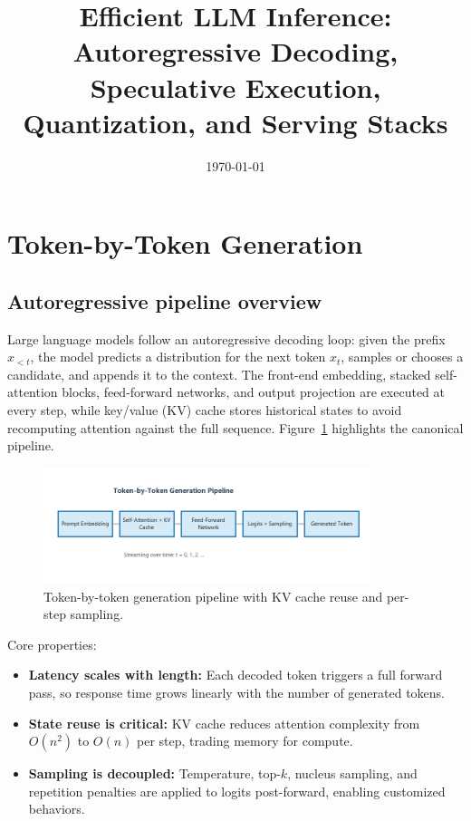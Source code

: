 \documentclass{article}
\title{Efficient LLM Inference: Autoregressive Decoding, Speculative Execution, Quantization, and Serving Stacks}
\author{}
\date{\today}
\begin{document}
\maketitle

\section{Token-by-Token Generation}
\subsection{Autoregressive pipeline overview}
Large language models follow an autoregressive decoding loop: given the prefix $x_{<t}$, the model predicts a distribution for the next token $x_t$, samples or chooses a candidate, and appends it to the context. The front-end embedding, stacked self-attention blocks, feed-forward networks, and output projection are executed at every step, while key/value (KV) cache stores historical states to avoid recomputing attention against the full sequence. Figure~\ref{fig:token_pipeline_en} highlights the canonical pipeline.
\begin{figure}[H]
  \centering
  \includegraphics[width=0.85\textwidth]{token_generation_pipeline.png}
  \caption{Token-by-token generation pipeline with KV cache reuse and per-step sampling.}
  \label{fig:token_pipeline_en}
\end{figure}
Core properties:
\begin{itemize}
  \item \textbf{Latency scales with length:} Each decoded token triggers a full forward pass, so response time grows linearly with the number of generated tokens.
  \item \textbf{State reuse is critical:} KV cache reduces attention complexity from $O(n^2)$ to $O(n)$ per step, trading memory for compute.
  \item \textbf{Sampling is decoupled:} Temperature, top-$k$, nucleus sampling, and repetition penalties are applied to logits post-forward, enabling customized behaviors.
\end{itemize}
\end{document}
